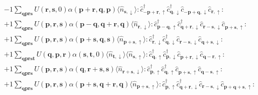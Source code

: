 \begin{align*}
	&-1 \sum_{ \mathbf{q} \mathbf{p} \mathbf{r} \mathbf{s} } U( \mathbf{r}, \mathbf{s}, 0 )  \alpha( \mathbf{p}+\mathbf{r}, \mathbf{q}, \mathbf{p} )   \langle \hat{n}_{ \mathbf{s}, \downarrow } \rangle :\hat{c}_{ -\mathbf{p}+\mathbf{r}, \uparrow }^\dagger \hat{c}_{ \mathbf{q}, \downarrow }^\dagger \hat{c}_{ -\mathbf{p}+\mathbf{q}, \downarrow }^{\phantom{\dagger}}\hat{c}_{ \mathbf{r}, \uparrow }^{\phantom{\dagger}}: \\
	&+1 \sum_{ \mathbf{q} \mathbf{p} \mathbf{r} \mathbf{s} } U( \mathbf{p}, \mathbf{r}, \mathbf{s} )  \alpha( \mathbf{p}-\mathbf{q}, \mathbf{q}+\mathbf{r}, \mathbf{q} )   \langle \hat{n}_{ \mathbf{r}, \downarrow } \rangle :\hat{c}_{ \mathbf{p}-\mathbf{q}, \uparrow }^\dagger \hat{c}_{ \mathbf{q}+\mathbf{r}, \downarrow }^\dagger \hat{c}_{ \mathbf{r}-\mathbf{s}, \downarrow }^{\phantom{\dagger}}\hat{c}_{ \mathbf{p}+\mathbf{s}, \uparrow }^{\phantom{\dagger}}: \\
	&+1 \sum_{ \mathbf{q} \mathbf{p} \mathbf{r} \mathbf{s} } U( \mathbf{p}, \mathbf{r}, \mathbf{s} )  \alpha( \mathbf{p}+\mathbf{s}, \mathbf{q}, \mathbf{s} )   \langle \hat{n}_{ \mathbf{p}+\mathbf{s}, \uparrow } \rangle :\hat{c}_{ \mathbf{r}, \downarrow }^\dagger \hat{c}_{ \mathbf{q}, \downarrow }^\dagger \hat{c}_{ \mathbf{r}-\mathbf{s}, \downarrow }^{\phantom{\dagger}}\hat{c}_{ \mathbf{q}+\mathbf{s}, \downarrow }^{\phantom{\dagger}}: \\
	&+1 \sum_{ \mathbf{q} \mathbf{p} \mathbf{r} \mathbf{s} \mathbf{t} } U( \mathbf{q}, \mathbf{p}, \mathbf{r} )  \alpha( \mathbf{s}, \mathbf{t}, 0 )   \langle \hat{n}_{ \mathbf{t}, \downarrow } \rangle \langle \hat{n}_{ \mathbf{s}, \uparrow } \rangle :\hat{c}_{ \mathbf{q}, \uparrow }^\dagger \hat{c}_{ \mathbf{p}, \downarrow }^\dagger \hat{c}_{ \mathbf{p}+\mathbf{r}, \downarrow }^{\phantom{\dagger}}\hat{c}_{ \mathbf{q}-\mathbf{r}, \uparrow }^{\phantom{\dagger}}: \\
	&+1 \sum_{ \mathbf{q} \mathbf{p} \mathbf{r} \mathbf{s} } U( \mathbf{p}, \mathbf{r}, \mathbf{s} )  \alpha( \mathbf{q}, \mathbf{r}+\mathbf{s}, \mathbf{s} )   \langle \hat{n}_{ \mathbf{r}+\mathbf{s}, \downarrow } \rangle :\hat{c}_{ \mathbf{p}, \uparrow }^\dagger \hat{c}_{ \mathbf{q}, \uparrow }^\dagger \hat{c}_{ \mathbf{p}+\mathbf{s}, \uparrow }^{\phantom{\dagger}}\hat{c}_{ \mathbf{q}-\mathbf{s}, \uparrow }^{\phantom{\dagger}}: \\
	&+1 \sum_{ \mathbf{q} \mathbf{p} \mathbf{r} \mathbf{s} } U( \mathbf{p}, \mathbf{r}, \mathbf{s} )  \alpha( \mathbf{p}+\mathbf{s}, \mathbf{q}+\mathbf{r}, \mathbf{q} )   \langle \hat{n}_{ \mathbf{p}+\mathbf{s}, \uparrow } \rangle :\hat{c}_{ \mathbf{p}, \uparrow }^\dagger \hat{c}_{ \mathbf{q}+\mathbf{r}, \downarrow }^\dagger \hat{c}_{ \mathbf{r}-\mathbf{s}, \downarrow }^{\phantom{\dagger}}\hat{c}_{ \mathbf{p}+\mathbf{q}+\mathbf{s}, \uparrow }^{\phantom{\dagger}}: \\

\end{align*}
